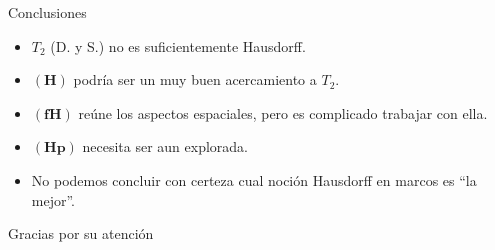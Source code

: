 \documentclass[compress,12pt]{beamer}
\begin{document}
\begin{frame}[standout]{Conclusiones}
    \begin{itemize}
        \item $T_2$ (D. y S.) no es suficientemente Hausdorff.
        \item<2-> $\mathbf{(H)}$ podría ser un muy buen acercamiento a $T_2$.
        \item<3-> $\mathbf{(fH)}$ reúne los aspectos espaciales, pero es complicado trabajar con ella.
        \item<4-> $\mathbf{(Hp)}$ necesita ser aun explorada.
        \item<5-> No podemos concluir con certeza cual noción Hausdorff en marcos es ``la mejor''.
    \end{itemize}
\end{frame}

\begin{frame}
      \centering
      \Huge{\smiley Gracias por su atención\smiley}
\end{frame}

\End
\end{document}
